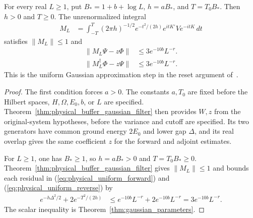 \begin{theorem}
    For every real $L\ge1$, put $B_*=1+b+\log L$, $h=aB_*$, and
    $T=T_0B_*$. Then $h>0$ and $T\ge0$. The unrenormalized integral
    \begin{align}
        M_L&=\int_{-T}^{T}(2\pi h)^{-1/2}e^{-t^2/(2h)}
            e^{itK'}V e^{-itK}\,dt
        \label{eq:physical_uniform_integral}
    \end{align}
    satisfies $\|M_L\|\le1$ and
    \begin{align}
        \|M_L\Psi-z\Phi\|&\le3e^{-10b}L^{-r}.
        \label{eq:physical_uniform_forward}
    \end{align}
    \begin{align}
        \|M_L^\dagger\Phi-z\Psi\|&\le3e^{-10b}L^{-r}.
        \label{eq:physical_uniform_reverse}
    \end{align}
    This is the uniform Gaussian approximation step in the reset
    argument of~\cite{OpenAI2026PolynomialPEPS}.
\end{theorem}
\begin{proof}\leanok
    The first condition forces $a>0$. The constants $a,T_0$ are fixed before the
    Hilbert spaces, $H,\Omega,E_0,b$, or $L$ are specified.
    Theorem~\ref{thm:physical_buffer_gaussian_filter} then provides $W,z$
    from the original-system hypotheses, before the variance and cutoff
    are specified. Its two generators have common ground energy $2E_0$
    and lower gap $\Delta$, and its real overlap gives the same
    coefficient $z$ for the forward and adjoint estimates.

    For $L\ge1$, one has $B_*\ge1$, so $h=aB_*>0$ and $T=T_0B_*\ge0$.
    Theorem~\ref{thm:physical_buffer_gaussian_filter} gives
    $\|M_L\|\le1$ and bounds each residual in
    (\ref{eq:physical_uniform_forward}) and
    (\ref{eq:physical_uniform_reverse}) by
    \begin{align}
        e^{-h\Delta^2/2}+2e^{-T^2/(2h)}
        &\le e^{-10b}L^{-r}+2e^{-10b}L^{-r}
         =3e^{-10b}L^{-r}.
        \label{eq:physical_uniform_error_sum}
    \end{align}
    The scalar inequality is Theorem~\ref{thm:gaussian_parameters}.
\end{proof}
